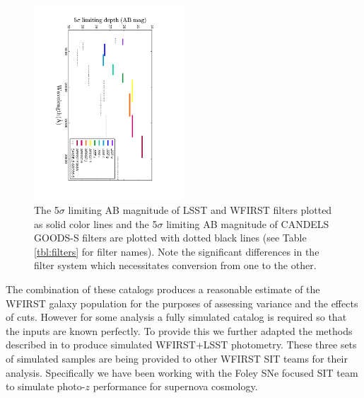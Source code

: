 \begin{figure}
\centering
  \includegraphics[trim=0cm 0cm 0cm 0cm, clip,width=0.50\textwidth] {Plots/filters.pdf}
\caption{The 5$\sigma$ limiting AB magnitude of LSST and WFIRST filters plotted
as solid color lines and the 5$\sigma$ limiting AB magnitude of CANDELS GOODS-S
filters are plotted with dotted black lines (see Table \ref{tbl:filters} for
filter names).  Note the significant differences in the filter system which
necessitates conversion from one to the other.}
\label{fig:filters}
\end{figure}

The combination of these catalogs produces a reasonable estimate of the WFIRST
galaxy population for the purposes of assessing variance and the effects of
cuts.  However for some analysis a fully simulated catalog is required so that
the inputs are known perfectly.  To provide this we further adapted the methods
described in \citet{stickley2016} to produce simulated WFIRST+LSST photometry.
These three sets of simulated samples are being provided to other WFIRST SIT
teams for their analysis. Specifically we have been working with the Foley SNe focused SIT
team to simulate photo-$z$ performance for supernova cosmology.


